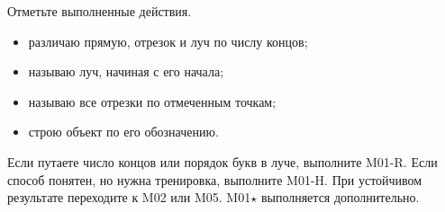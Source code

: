 \begin{reflectionbox}
  Отметьте выполненные действия.
  \begin{itemize}[label=\choicebox]
    \item различаю прямую, отрезок и луч по числу концов;
    \item называю луч, начиная с его начала;
    \item называю все отрезки по отмеченным точкам;
    \item строю объект по его обозначению.
  \end{itemize}
\end{reflectionbox}

\begin{resultbox}
  Если путаете число концов или порядок букв в луче, выполните M01-R.
  Если способ понятен, но нужна тренировка, выполните M01-H. При устойчивом
  результате переходите к M02 или M05. M01\(\star\) выполняется дополнительно.
\end{resultbox}
